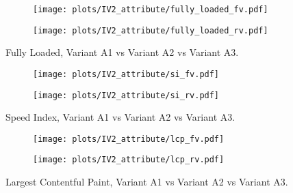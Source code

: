 \begin{figure}
	\centering
	\begin{subfigure}{.5\textwidth}
		\centering
		\texttt{[image: plots/IV2\_attribute/fully\_loaded\_fv.pdf]}
		\label{fig:sub1}
	\end{subfigure}%
	\begin{subfigure}{.5\textwidth}
		\centering
		\texttt{[image: plots/IV2\_attribute/fully\_loaded\_rv.pdf]}
		\label{fig:sub2}
	\end{subfigure}
	\caption{Fully Loaded, Variant A1 vs Variant A2 vs Variant A3.}
	\label{figure:plt_original_test}
\end{figure}

\clearpage

\begin{figure}
	\centering
	\begin{subfigure}{.5\textwidth}
		\centering
		\texttt{[image: plots/IV2\_attribute/si\_fv.pdf]}
		\label{fig:sub1}
	\end{subfigure}%
	\begin{subfigure}{.5\textwidth}
		\centering
		\texttt{[image: plots/IV2\_attribute/si\_rv.pdf]}
		\label{fig:sub2}
	\end{subfigure}
	\caption{Speed Index, Variant A1 vs Variant A2 vs Variant A3.}
	\label{figure:plt_original_test}
\end{figure}


\begin{figure}
	\centering
	\begin{subfigure}{.5\textwidth}
		\centering
		\texttt{[image: plots/IV2\_attribute/lcp\_fv.pdf]}
		\label{fig:sub1}
	\end{subfigure}%
	\begin{subfigure}{.5\textwidth}
		\centering
		\texttt{[image: plots/IV2\_attribute/lcp\_rv.pdf]}
		\label{fig:sub2}
	\end{subfigure}
	\caption{Largest Contentful Paint, Variant A1 vs Variant A2 vs Variant A3.}
	\label{figure:plt_original_test}
\end{figure}






